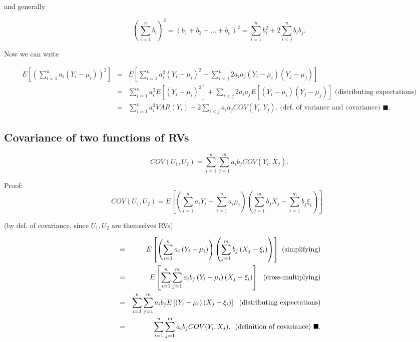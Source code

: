 \documentclass[11pt]{article}
\begin{document}
and generally

\begin{equation*}
\left( \sum_{i=1}^{n}b_{i}\right) ^{2}=\left( b_{1}+b_{2}+...+b_{n}\right)
^{2}=\sum_{i=1}^{n}b_{i}^{2}+2\sum_{i<j}^{n}b_{i}b_{j}.
\end{equation*}

\medskip Now we can write

\begin{eqnarray*}
E\left[ \left( \sum_{i=1}^{n}a_{i}\left( Y_{i}-\mu _{i}\right) \right) ^{2}%
\right] &=&E\left[ \sum_{i=1}^{n}a_{i}^{2}\left( Y_{i}-\mu _{i}\right)
^{2}+\sum_{i<j}^{n}2a_{i}a_{j}\left( Y_{i}-\mu _{i}\right) \left( Y_{j}-\mu
_{j}\right) \right] \\
&=&\sum_{i=1}^{n}a_{i}^{2}E\left[ \left( Y_{i}-\mu _{i}\right) ^{2}\right]
+\sum_{i<j}2a_{i}a_{j}E\left[ \left( Y_{i}-\mu _{i}\right) \left( Y_{j}-\mu
_{j}\right) \right] \text{ \ (distributing expectations)} \\
&=&\sum_{i=1}^{n}a_{i}^{2}VAR(Y_{i})+2\sum_{i<j}a_{i}a_{j}COV(Y_{i},Y_{j}).%
\text{ \ (def. of variance and covariance) }\blacksquare .
\end{eqnarray*}%
\newpage

\subsection{Covariance of two functions of RVs\protect\bigskip}

\begin{equation}
COV(U_{1},U_{2})=\sum_{i=1}^{n}\sum_{j=1}^{m}a_{i}b_{j}COV(Y_{i},X_{j}). 
\tag{3}
\end{equation}

Proof:%
\begin{equation*}
COV(U_{1},U_{2})=E\left[ \left(
\sum_{i=1}^{n}a_{i}Y_{i}-\sum_{i=1}^{n}a_{i}\mu _{i}\right) \left(
\sum_{j=1}^{m}b_{j}X_{j}-\sum_{i=1}^{m}b_{j}\xi _{i}\right) \right] \text{ }
\end{equation*}

\begin{center}
(by def. of covariance, since $U_{1},U_{2}$ are themselves RVs)
\end{center}

\begin{eqnarray*}
&=&E\left[ \left( \sum_{i=1}^{n}a_{i}\left( Y_{i}-\mu _{i}\right) \right)
\left( \sum_{j=1}^{m}b_{j}\left( X_{j}-\xi _{i}\right) \right) \right] \text{
(simplifying)} \\
&=&E\left[ \sum_{i=1}^{n}\sum_{j=1}^{m}a_{i}b_{j}\left( Y_{i}-\mu
_{i}\right) \left( X_{j}-\xi _{i}\right) \right] \text{ \ (cross-multiplying)%
} \\
&=&\sum_{i=1}^{n}\sum_{j=1}^{m}a_{i}b_{j}E\left[ \left( Y_{i}-\mu
_{i}\right) \left( X_{j}-\xi _{i}\right) \right] \text{ \ (distributing
expectations)} \\
&=&\sum_{i=1}^{n}\sum_{j=1}^{m}a_{i}b_{j}COV(Y_{i},X_{j}).\text{ \
(definition of covariance) }\blacksquare .
\end{eqnarray*}
\end{document}
